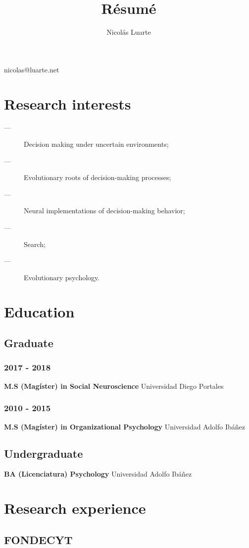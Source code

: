 \documentclass{article}
\makeatletter
\renewcommand{\maketitle}{
\begin{center}
{\huge\bfseries
\theauthor}

\vspace{.25em}

nicolas@luarte.net

\end{center}
}
\makeatother
\begin{document}
\title{R\'esum\'e}
\author{Nicol\'as Luarte}


\maketitle
\section{Research interests}
\vspace{.90em}
\begin{description}
    \item[---]Decision making under uncertain environments;
    \item[---]Evolutionary roots of decision-making processes;
    \item[---]Neural implementations of decision-making behavior;
    \item[---]Search;
    \item[---]Evolutionary psychology.
\end{description}   
\section{Education}
\subsection{Graduate}\vspace{.90em}
\subsubsection{2017 -  2018}
\textbf{M.S (Mag\'ister) in Social Neuroscience} Universidad Diego Portales 
\subsubsection{2010 - 2015}
\textbf{M.S (Mag\'ister) in Organizational Psychology} Universidad Adolfo Ib\'a\~nez
\subsection{Undergraduate}\vspace{.90em}
\textbf{BA (Licenciatura) Psychology} Universidad Adolfo Ib\'a\~nez 
\section{Research experience}
\blindtext
\subsection{FONDECYT}
\blindtext
\end{document}
